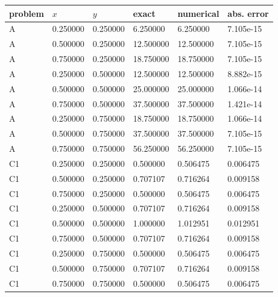\begin{tabular}{llllll}
\toprule
problem & $x$ & $y$ & exact & numerical & abs. error \\
\midrule
A & 0.250000 & 0.250000 & 6.250000 & 6.250000 & 7.105e-15 \\
A & 0.500000 & 0.250000 & 12.500000 & 12.500000 & 7.105e-15 \\
A & 0.750000 & 0.250000 & 18.750000 & 18.750000 & 7.105e-15 \\
A & 0.250000 & 0.500000 & 12.500000 & 12.500000 & 8.882e-15 \\
A & 0.500000 & 0.500000 & 25.000000 & 25.000000 & 1.066e-14 \\
A & 0.750000 & 0.500000 & 37.500000 & 37.500000 & 1.421e-14 \\
A & 0.250000 & 0.750000 & 18.750000 & 18.750000 & 1.066e-14 \\
A & 0.500000 & 0.750000 & 37.500000 & 37.500000 & 7.105e-15 \\
A & 0.750000 & 0.750000 & 56.250000 & 56.250000 & 7.105e-15 \\
C1 & 0.250000 & 0.250000 & 0.500000 & 0.506475 & 0.006475 \\
C1 & 0.500000 & 0.250000 & 0.707107 & 0.716264 & 0.009158 \\
C1 & 0.750000 & 0.250000 & 0.500000 & 0.506475 & 0.006475 \\
C1 & 0.250000 & 0.500000 & 0.707107 & 0.716264 & 0.009158 \\
C1 & 0.500000 & 0.500000 & 1.000000 & 1.012951 & 0.012951 \\
C1 & 0.750000 & 0.500000 & 0.707107 & 0.716264 & 0.009158 \\
C1 & 0.250000 & 0.750000 & 0.500000 & 0.506475 & 0.006475 \\
C1 & 0.500000 & 0.750000 & 0.707107 & 0.716264 & 0.009158 \\
C1 & 0.750000 & 0.750000 & 0.500000 & 0.506475 & 0.006475 \\
\bottomrule
\end{tabular}
